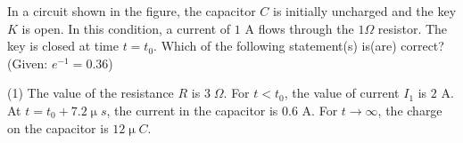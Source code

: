 \item In a circuit shown in the figure, the capacitor \( C \) is initially uncharged and the key \( K \) is open. In this condition, a current of \( 1 \) A flows through the \( 1 \Omega \) resistor. The key is closed at time \( t = t_0 \). Which of the following statement(s) is(are) correct? (Given: \( e^{-1} = 0.36 \))
    \begin{center}
    \end{center}
    \begin{tasks}(1)
        \task The value of the resistance \( R \) is \( 3 \; \Omega \). \ans
        \task For \( t < t_0 \), the value of current \( I_1 \) is \( 2 \) A. \ans
        \task At \( t = t_0 + 7.2 \upmu s \), the current in the capacitor is \( 0.6 \) A. \ans
        \task For \( t \to \infty \), the charge on the capacitor is \( 12 \upmu C \). \ans
    \end{tasks}

